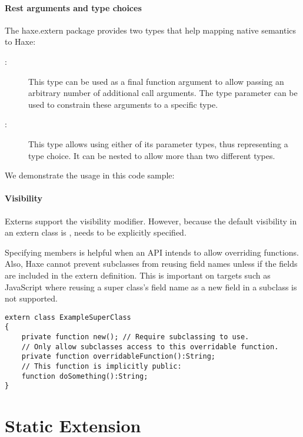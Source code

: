 \paragraph{Rest arguments and type choices}

The haxe.extern package provides two types that help mapping native semantics to Haxe:

\begin{description}
	\item[:] This type can be used as a final function argument to allow passing an arbitrary number of additional call arguments. The type parameter can be used to constrain these arguments to a specific type.
	\item[:] This type allows using either of its parameter types, thus representing a type choice. It can be nested to allow more than two different types.
\end{description}

We demonstrate the usage in this code sample:


\paragraph{Visibility}

Externs support the  visibility modifier. However, because the default visibility in an extern class is ,  needs to be explicitly specified.

Specifying  members is helpful when an API intends to allow overriding functions. Also, Haxe cannot prevent subclasses from reusing field names unless if the fields are included in the extern definition. This is important on targets such as JavaScript where reusing a super class’s field name as a new field in a subclass is not supported.

\begin{lstlisting}
extern class ExampleSuperClass
{
	private function new(); // Require subclassing to use.
	// Only allow subclasses access to this overridable function.
	private function overridableFunction():String;
	// This function is implicitly public:
	function doSomething():String;
}
\end{lstlisting}


\section{Static Extension}
\label{lf-static-extension}

